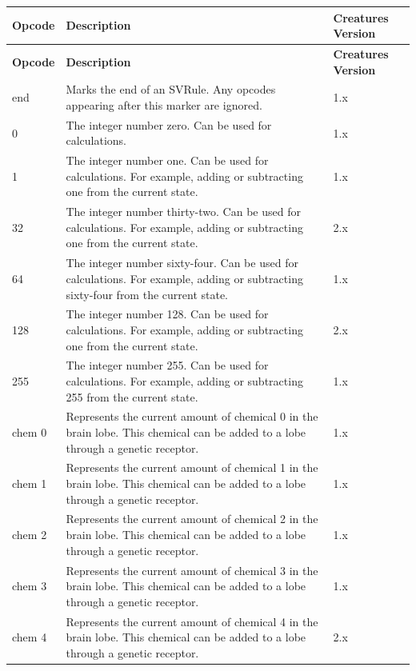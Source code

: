 \documentclass[11pt,twoside,a4paper]{article}
\begin{document}
\begin{longtable}[h]{|p{}|p{}|p{}|}
	\hline \rowcolor[gray]{0.75} \textbf{Opcode}	&	\textbf{Description}	&	\textbf{Creatures Version}		\\ \hline
	\endfirsthead
	\hline \rowcolor[gray]{0.75} \textbf{Opcode}	&	\textbf{Description}	&	\textbf{Creatures Version}		\\ \hline
	\endhead
	\hline 
	\endfoot
	\hline
	\endlastfoot	
	end					&	Marks the end of an SVRule. Any opcodes appearing after this marker are ignored.													&	1.x		\\ \hline
	0					&	The integer number zero. Can be used for calculations.																				&	1.x		\\ \hline
	1					&	The integer number one. Can be used for calculations. For example, adding or subtracting one from the current state.				&	1.x		\\ \hline
	32					&	The integer number thirty-two. Can be used for calculations. For example, adding or subtracting one from the current state.			&	2.x		\\ \hline
	64					&	The integer number sixty-four. Can be used for calculations. For example, adding or subtracting sixty-four from the current state.	&	1.x		\\ \hline
	128					&	The integer number 128. Can be used for calculations. For example, adding or subtracting one from the current state.				&	2.x		\\ \hline
	255					&	The integer number 255. Can be used for calculations. For example, adding or subtracting 255 from the current state.				&	1.x		\\ \hline
	chem 0				&	Represents the current amount of chemical 0 in the brain lobe. This chemical can be added to a lobe through a genetic receptor.		&	1.x		\\ \hline
	chem 1				&	Represents the current amount of chemical 1 in the brain lobe. This chemical can be added to a lobe through a genetic receptor.		&	1.x		\\ \hline
	chem 2				&	Represents the current amount of chemical 2 in the brain lobe. This chemical can be added to a lobe through a genetic receptor.		&	1.x		\\ \hline
	chem 3				&	Represents the current amount of chemical 3 in the brain lobe. This chemical can be added to a lobe through a genetic receptor.		&	1.x		\\ \hline
	chem 4				&	Represents the current amount of chemical 4 in the brain lobe. This chemical can be added to a lobe through a genetic receptor.		&	2.x		\\ \hline

\end{longtable}
\end{document}
